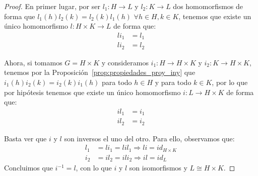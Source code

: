 \begin{teo}
   \begin{proof}
       En primer lugar, por ser $l_1:H\to L$ y $l_2:K\to L$ dos homomorfismos de forma que $l_1(h)l_2(k) = l_2(k)l_1(h)$ $\forall h\in H,k\in K$, tenemos que existe un único homomorfismo $l:H\times K\to L$ de forma que:
       \begin{align*}
           li_1 &= l_1 \\
           li_2 &= l_2
       \end{align*}
       \begin{figure}[H]
           \centering
       \end{figure}
       \noindent
       Ahora, si tomamos $G=H\times K$ y consideramos $i_1:H\to H\times K$ y $i_2:K\to H\times K$, tenemos por la Proposición~\ref{prop:propiedades_proy_iny} que $i_1(h)i_2(k) = i_2(k)i_1(h)$ para todo $h\in H$ y para todo $k\in K$, por lo que por hipótesis tenemos que existe un único homomorfismo $i:L\to H\times K$ de forma que: 
       \begin{align*}
           il_1 &= i_1 \\
           il_2 &= i_2 
       \end{align*}
       \begin{figure}[H]
           \centering
       \end{figure}
       Basta ver que $i$ y $l$ son inversos el uno del otro. Para ello, observamos que:
       \begin{align*}
           l_1 &= li_1 = lil_1 \Longrightarrow li = id_{H\times K} \\
           i_2 &= il_2 = ili_2 \Longrightarrow il = id_L
       \end{align*}
       Concluimos que $i^{-1} = l$, con lo que $i$ y $l$ son isomorfismos y $L\cong H\times K$.
   \end{proof}
\end{teo}

